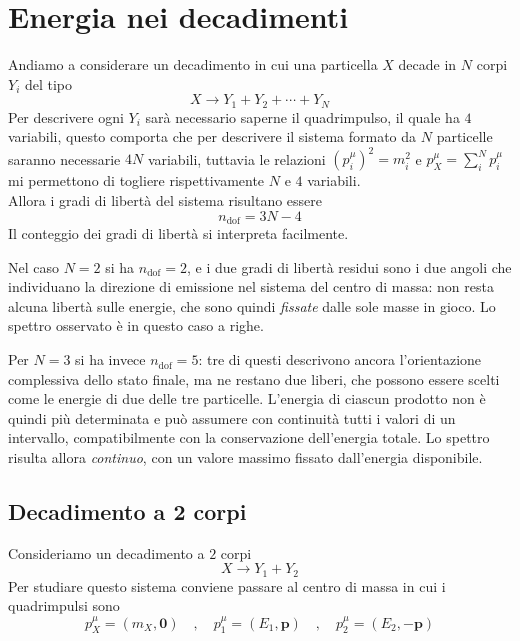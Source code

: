 \chapter{Energia nei decadimenti}
\label{Esercitazione2}

Andiamo a considerare un decadimento in cui una particella $X$ decade in $N$ corpi $Y_i$ del tipo 
%
\begin{equation}
    X \to Y_1 + Y_2 + \cdots + Y_N
\end{equation}
Per descrivere ogni $Y_i$ sarà necessario saperne il quadrimpulso, il quale ha $4$ variabili, questo comporta che per descrivere il sistema formato da $N$ particelle saranno necessarie $4N$ variabili, tuttavia le relazioni $(p^{\mu}_i)^2 = m_i^2$ e $p^{\mu}_X = \sum_i^N p^{\mu}_i$ mi permettono di togliere rispettivamente $N$ e $4$ variabili.\\
Allora i gradi di libertà del sistema risultano essere
%
\begin{equation}
    n_{\text{dof}} = 3N - 4
\end{equation}
Il conteggio dei gradi di libertà si interpreta facilmente. 

Nel caso $N = 2$ si ha $n_{\text{dof}} = 2$, e i due gradi di libertà residui sono i due angoli che individuano la direzione di emissione nel sistema del centro di massa: non resta alcuna libertà sulle energie, che sono quindi \emph{fissate} dalle sole masse in gioco. Lo spettro osservato è in questo caso a righe. 

Per $N = 3$ si ha invece $n_{\text{dof}} = 5$: tre di questi descrivono ancora l'orientazione complessiva dello stato finale, ma ne restano due liberi, che possono essere scelti come le energie di due delle tre particelle. L'energia di ciascun prodotto non è quindi più determinata e può assumere con continuità tutti i valori di un intervallo, compatibilmente con la conservazione dell'energia totale. Lo spettro risulta allora \emph{continuo}, con un valore massimo fissato dall'energia disponibile. 

\section{Decadimento a 2 corpi}

Consideriamo un decadimento a $2$ corpi 
%
\begin{equation}
    X \to Y_1 + Y_2
\end{equation}
Per studiare questo sistema conviene passare al centro di massa in cui i quadrimpulsi sono 
%
\begin{equation*}
    p_X^{\mu} = (m_X, \mathbf{0}) \quad, \quad p_1^{\mu} = (E_1, \mathbf{p}) \quad, \quad p_2^{\mu} = (E_2, - \mathbf{p})  
\end{equation*}

